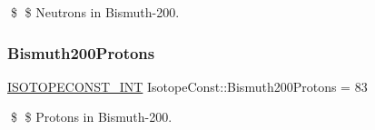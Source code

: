 \$ \$ Neutrons in Bismuth-\/200. \mbox{\label{group___isotope_const-_bismuth-_bi200_gacf3e337026225cecf11e77de58855d12}} 
\subsubsection{\texorpdfstring{Bismuth200\+Protons}{Bismuth200Protons}}
{\footnotesize\ttfamily \mbox{\hyperlink{group___isotope_const-_macros_ga5f18360b3e99483a35c32d789e62621c}{I\+S\+O\+T\+O\+P\+E\+C\+O\+N\+S\+T\+\_\+\+I\+NT}} Isotope\+Const\+::\+Bismuth200\+Protons = 83}

\$ \$ Protons in Bismuth-\/200. 